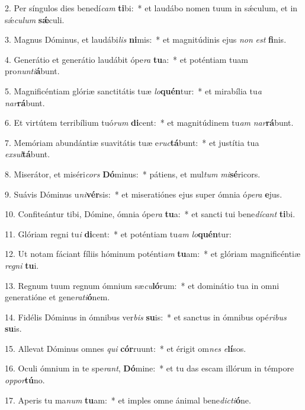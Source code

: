 2. Per síngulos dies benedí\textit{cam} \textbf{ti}bi:~*  et laudábo nomen tuum in sǽculum, et in sǽ\textit{cu}\textit{lum} \textbf{sǽ}culi.\

3. Magnus Dóminus, et laudábi\textit{lis} \textbf{ni}mis:~*  et magnitúdinis ejus \textit{non} \textit{est} \textbf{fi}nis.\

4. Generátio et generátio laudábit ópe\textit{ra} \textbf{tu}a:~*  et poténtiam tuam pro\textit{nun}\textit{ti}\textbf{á}bunt.\

5. Magnificéntiam glóriæ sanctitátis tuæ \textit{lo}\textbf{quén}tur:~*  et mirabília tu\textit{a} \textit{nar}\textbf{rá}bunt.\

6. Et virtútem terribílium tuó\textit{rum} \textbf{di}cent:~*  et magnitúdinem tu\textit{am} \textit{nar}\textbf{rá}bunt.\

7. Memóriam abundántiæ suavitátis tuæ e\textit{ruc}\textbf{tá}bunt:~*  et justítia tua \textit{ex}\textit{sul}\textbf{tá}bunt.\

8. Miserátor, et miséri\textit{cors} \textbf{Dó}minus:~*  pátiens, et mul\textit{tum} \textit{mi}\textbf{sé}ricors.\

9. Suávis Dóminus u\textit{ni}\textbf{vér}sis:~*  et miseratiónes ejus super ómnia ó\textit{pe}\textit{ra} \textbf{e}jus.\

10. Confiteántur tibi, Dómine, ómnia ópe\textit{ra} \textbf{tu}a:~*  et sancti tui bene\textit{dí}\textit{cant} \textbf{ti}bi.\

11. Glóriam regni tu\textit{i} \textbf{di}cent:~*  et poténtiam tu\textit{am} \textit{lo}\textbf{quén}tur:\

12. Ut notam fáciant fíliis hóminum poténti\textit{am} \textbf{tu}am:~*  et glóriam magnificéntiæ \textit{re}\textit{gni} \textbf{tu}i.\

13. Regnum tuum regnum ómnium sæ\textit{cu}\textbf{ló}rum:~*  et dominátio tua in omni generatióne et gene\textit{ra}\textit{ti}\textbf{ó}nem.\

14. Fidélis Dóminus in ómnibus ver\textit{bis} \textbf{su}is:~*  et sanctus in ómnibus opé\textit{ri}\textit{bus} \textbf{su}is.\

15. Allevat Dóminus omnes \textit{qui} \textbf{cór}ruunt:~*  et érigit om\textit{nes} \textit{e}\textbf{lí}sos.\

16. Oculi ómnium in te spe\textit{rant}, \textbf{Dó}mine:~*  et tu das escam illórum in témpore \textit{op}\textit{por}\textbf{tú}no.\

17. Aperis tu ma\textit{num} \textbf{tu}am:~*  et imples omne ánimal bene\textit{dic}\textit{ti}\textbf{ó}ne.\

